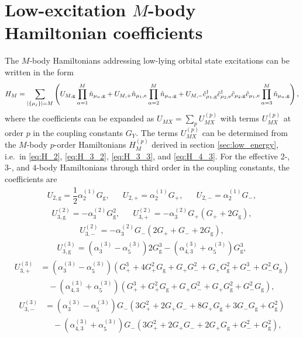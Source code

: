 \documentclass[preprint,showkeys,nofootinbib]{revtex4-1}
\newcommand{\f}{\dfrac} %
\newcommand{\p}[1]{\left(#1\right)} %
\renewcommand{\set}[1]{\left\{#1\right\}} %
\newcommand{\g}{\text{g}}
\newcommand{\e}{\text{e}}
\renewcommand{\c}{\hat{c}}
\newcommand{\n}{\hat{n}}
\newcommand{\1}{\mathds{1}}
\begin{document}
\section{Low-excitation $M$-body Hamiltonian coefficients}
\label{sec:U_X}

The $M$-body Hamiltonians addressing low-lying orbital state
excitations can be written in the form
\begin{align}
  H_M = \sum_{\abs{\set{\mu_j}}=M}
  \p{U_{M,\g} \prod_{\alpha=1}^M \n_{\mu_\alpha,\g}
    + U_{M,+} \n_{\mu_1,\e} \prod_{\alpha=2}^M \n_{\mu_\alpha,\g}
    + U_{M,-} \c_{\mu_1,\g}^\dag \c_{\mu_2,\e}^\dag
    \c_{\mu_2,\g} \c_{\mu_1,\e} \prod_{\alpha=3}^M \n_{\mu_\alpha,\g}},
\end{align}
where the coefficients can be expanded as
$U_{MX} = \sum_p U_{MX}^{(p)}$ with terms $U_{MX}^{(p)}$ at order $p$
in the coupling constants $G_Y$.  The terms $U_{MX}^{(p)}$ can be
determined from the $M$-body $p$-order Hamiltonians $H_M^{(p)}$
derived in section \ref{sec:low_energy}, i.e.~in \eqref{eq:H_2},
\eqref{eq:H_3_2}, \eqref{eq:H_3_3}, and \eqref{eq:H_4_3}.  For the
effective 2-, 3-, and 4-body Hamiltonians through third order in the
coupling constants, the coefficients are
\begin{align}
  U_{2,\g} = \f12 \alpha_2^{(1)} G_\g,
  &&
  U_{2,+} = \alpha_2^{(1)} G_+,
  &&
  U_{2,-} = \alpha_2^{(1)} G_-,
\end{align}
\begin{align}
  U_{3,\g}^{(2)} = - \alpha_3^{(2)} G_\g^2,
  &&
  U_{3,+}^{(2)} = - \alpha_3^{(2)} G_+ \p{G_+ + 2 G_\g},
\end{align}
\begin{align}
  U_{3,-}^{(2)} = - \alpha_3^{(2)} G_- \p{2 G_+ + G_- + 2 G_\g},
\end{align}
\begin{align}
  U_{3,\g}^{(3)}
  = \p{\alpha_3^{(3)} - \alpha_5^{(3)}} 2 G_\g^3
  - \p{\alpha_{4,3}^{(3)} + \alpha_5^{(3)}} G_\g^3,
\end{align}
\begin{align}
  U_{3,+}^{(3)}
  &= \p{\alpha_3^{(3)} - \alpha_5^{(3)}} \p{G_+^3 + 4 G_+^2 G_\g
    + G_+ G_-^2 + G_+ G_\g^2 + G_-^3 + G_-^2 G_\g} \nonumber \\
  &\quad - \p{\alpha_{4,3}^{(3)} + \alpha_5^{(3)}}
  \p{G_+^3 + G_+^2 G_\g + G_+ G_-^2 + G_+ G_\g^2 + G_-^2 G_\g},
\end{align}
\begin{align}
  U_{3,-}^{(3)}
  &= \p{\alpha_3^{(3)} - \alpha_5^{(3)}} G_- \p{3 G_+^2
    + 2 G_+ G_- + 8 G_+ G_\g + 3 G_- G_\g + G_\g^2} \nonumber \\
  &\quad - \p{\alpha_{4,3}^{(3)} + \alpha_5^{(3)}}
  G_- \p{3 G_+^2 + 2 G_+ G_- + 2 G_+ G_\g + G_-^2 + G_\g^2},
\end{align}
\end{document}
